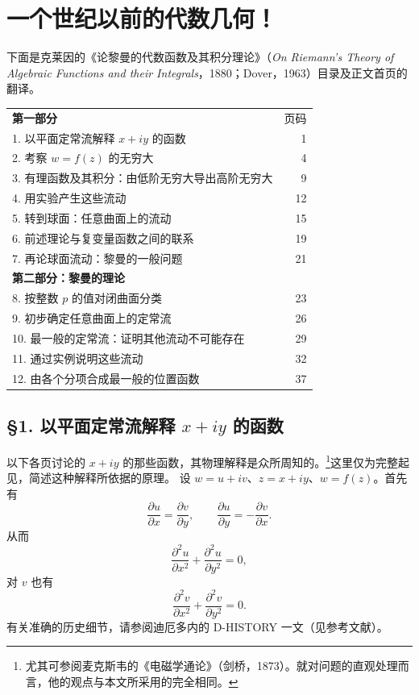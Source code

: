 \section*{一个世纪以前的代数几何！}
下面是克莱因的《论黎曼的代数函数及其积分理论》（\textit{On Riemann's Theory of Algebraic Functions and their Integrals}，1880；Dover，1963）目录及正文首页的翻译。
\begin{center}
\begin{tabular}{p{.82\linewidth}r}
\toprule
\textbf{第一部分}&页码\\
1. 以平面定常流解释 $x+iy$ 的函数&1\\
2. 考察 $w=f(z)$ 的无穷大&4\\
3. 有理函数及其积分：由低阶无穷大导出高阶无穷大&9\\
4. 用实验产生这些流动&12\\
5. 转到球面：任意曲面上的流动&15\\
6. 前述理论与复变量函数之间的联系&19\\
7. 再论球面流动：黎曼的一般问题&21\\
\midrule
\textbf{第二部分：黎曼的理论}&\\
8. 按整数 $p$ 的值对闭曲面分类&23\\
9. 初步确定任意曲面上的定常流&26\\
10. 最一般的定常流：证明其他流动不可能存在&29\\
11. 通过实例说明这些流动&32\\
12. 由各个分项合成最一般的位置函数&37\\
\bottomrule
\end{tabular}
\end{center}
\subsection*{§1. 以平面定常流解释 $x+iy$ 的函数}
以下各页讨论的 $x+iy$ 的那些函数，其物理解释是众所周知的。\footnote{尤其可参阅麦克斯韦的《电磁学通论》（剑桥，1873）。就对问题的直观处理而言，他的观点与本文所采用的完全相同。}这里仅为完整起见，简述这种解释所依据的原理。
设 $w=u+iv$、$z=x+iy$、$w=f(z)$。首先有
\[
\frac{\partial u}{\partial x}=\frac{\partial v}{\partial y},\qquad
\frac{\partial u}{\partial y}=-\frac{\partial v}{\partial x}.\tag{1}
\]
从而
\[
\frac{\partial^2u}{\partial x^2}+\frac{\partial^2u}{\partial y^2}=0,\tag{2}
\]
对 $v$ 也有
\[
\frac{\partial^2v}{\partial x^2}+\frac{\partial^2v}{\partial y^2}=0.\tag{3}
\]
有关准确的历史细节，请参阅迪厄多内的 D-HISTORY 一文（见参考文献）。

